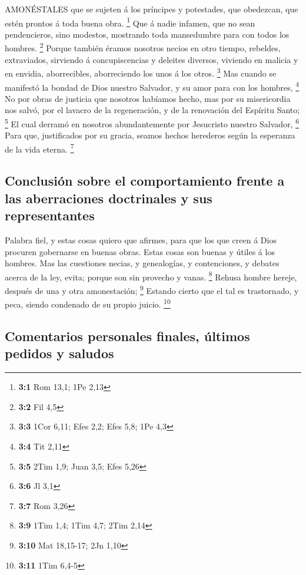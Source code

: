  AMONÉSTALES que se sujeten á los príncipes y potestades,
que obedezcan, que estén prontos á toda buena obra. \footnote{\textbf{3:1}
  Rom 13,1; 1Pe 2,13}  Que á nadie infamen, que no sean
pendencieros, sino modestos, mostrando toda mansedumbre para con todos
los hombres. \footnote{\textbf{3:2} Fil 4,5}  Porque también
éramos nosotros necios en otro tiempo, rebeldes, extraviados, sirviendo
á concupiscencias y deleites diversos, viviendo en malicia y en envidia,
aborrecibles, aborreciendo los unos á los otros. \footnote{\textbf{3:3}
  1Cor 6,11; Efes 2,2; Efes 5,8; 1Pe 4,3}  Mas cuando se
manifestó la bondad de Dios nuestro Salvador, y su amor para con los
hombres, \footnote{\textbf{3:4} Tit 2,11}  No por obras de
justicia que nosotros habíamos hecho, mas por su misericordia nos salvó,
por el lavacro de la regeneración, y de la renovación del Espíritu
Santo; \footnote{\textbf{3:5} 2Tim 1,9; Juan 3,5; Efes 5,26}
 El cual derramó en nosotros abundantemente por Jesucristo
nuestro Salvador, \footnote{\textbf{3:6} Jl 3,1}  Para que,
justificados por su gracia, seamos hechos herederos según la esperanza
de la vida eterna. \footnote{\textbf{3:7} Rom 3,26}

\hypertarget{conclusiuxf3n-sobre-el-comportamiento-frente-a-las-aberraciones-doctrinales-y-sus-representantes}{%
\subsection{Conclusión sobre el comportamiento frente a las aberraciones
doctrinales y sus
representantes}\label{conclusiuxf3n-sobre-el-comportamiento-frente-a-las-aberraciones-doctrinales-y-sus-representantes}}

 Palabra fiel, y estas cosas quiero que afirmes, para que
los que creen á Dios procuren gobernarse en buenas obras. Estas cosas
son buenas y útiles á los hombres.  Mas las cuestiones
necias, y genealogías, y contenciones, y debates acerca de la ley,
evita; porque son sin provecho y vanas. \footnote{\textbf{3:9} 1Tim 1,4;
  1Tim 4,7; 2Tim 2,14}  Rehusa hombre hereje, después de
una y otra amonestación; \footnote{\textbf{3:10} Mat 18,15-17; 2Jn 1,10}
 Estando cierto que el tal es trastornado, y peca, siendo
condenado de su propio juicio. \footnote{\textbf{3:11} 1Tim 6,4-5}

\hypertarget{comentarios-personales-finales-uxfaltimos-pedidos-y-saludos}{%
\subsection{Comentarios personales finales, últimos pedidos y
saludos}\label{comentarios-personales-finales-uxfaltimos-pedidos-y-saludos}}

